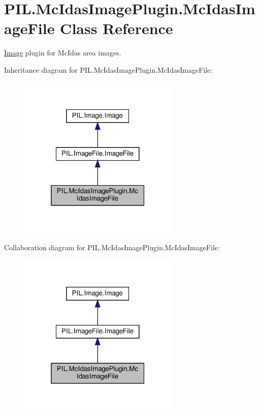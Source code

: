 \hypertarget{classPIL_1_1McIdasImagePlugin_1_1McIdasImageFile}{}\section{P\+I\+L.\+Mc\+Idas\+Image\+Plugin.\+Mc\+Idas\+Image\+File Class Reference}
\label{classPIL_1_1McIdasImagePlugin_1_1McIdasImageFile}


\hyperlink{namespacePIL_1_1Image}{Image} plugin for Mc\+Idas area images.  




Inheritance diagram for P\+I\+L.\+Mc\+Idas\+Image\+Plugin.\+Mc\+Idas\+Image\+File\+:
\nopagebreak
\begin{figure}[H]
\begin{center}
\leavevmode
\includegraphics[width=217pt]{classPIL_1_1McIdasImagePlugin_1_1McIdasImageFile__inherit__graph}
\end{center}
\end{figure}


Collaboration diagram for P\+I\+L.\+Mc\+Idas\+Image\+Plugin.\+Mc\+Idas\+Image\+File\+:
\nopagebreak
\begin{figure}[H]
\begin{center}
\leavevmode
\includegraphics[width=217pt]{classPIL_1_1McIdasImagePlugin_1_1McIdasImageFile__coll__graph}
\end{center}
\end{figure}
